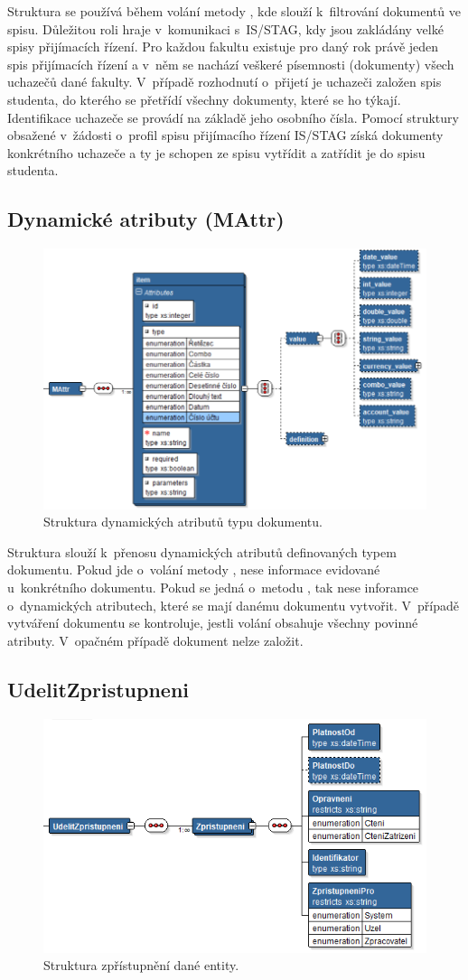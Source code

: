 \documentclass[
  master,
  field=ainfp,
  biblatex,
  language=czech,
  glossaries,
  theorems=false,
  index
]{kidiplom}
\begin{document}
Struktura se používá během volání metody , kde slouží k~filtrování dokumentů ve spisu.
Důležitou roli hraje v~komunikaci s~IS/STAG, kdy jsou zakládány velké spisy přijímacích řízení. Pro každou fakultu existuje pro daný rok právě jeden spis přijímacích řízení a v~něm se nachází veškeré písemnosti (dokumenty) všech uchazečů dané fakulty. V~případě rozhodnutí o~přijetí je uchazeči založen spis studenta, do kterého se přetřídí všechny dokumenty, které se ho týkají. Identifikace uchazeče se provádí na základě jeho osobního čísla. Pomocí struktury  obsažené v~žádosti o~profil spisu přijímacího řízení IS/STAG získá dokumenty konkrétního uchazeče a ty je schopen ze spisu vytřídit a zatřídit je do spisu studenta.


\subsection{Dynamické atributy (MAttr)}
\begin{figure}[h]
  \centerline{\includegraphics[width=0.6\linewidth]{./images/MAttr.png}} 
  \caption{Struktura dynamických atributů typu dokumentu.} 
\end{figure}

Struktura slouží k~přenosu dynamických atributů definovaných typem dokumentu. Pokud jde o~volání metody , nese informace evidované u~konkrétního dokumentu. Pokud se jedná o~metodu , tak nese inforamce o~dynamických atributech, které se mají danému dokumentu vytvořit.
V~případě vytváření dokumentu se kontroluje, jestli volání obsahuje všechny povinné atributy. V~opačném případě dokument nelze založit.

\subsection{UdelitZpristupneni}
\begin{figure}[h]
  \centerline{\includegraphics[width=0.6\linewidth]{./images/UdelitZpristupneni.png}} 
  \caption{Struktura zpřístupnění dané entity.} 
\end{figure}
\end{document}
